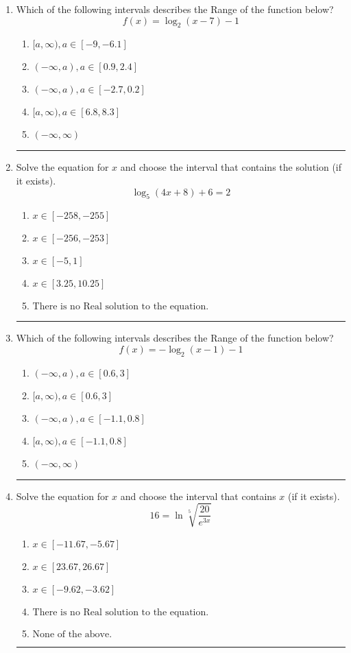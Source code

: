 \documentclass[14pt]{extbook}
\newcommand{\litem}[1]{\item#1\hspace*{-1cm}\rule{\textwidth}{0.4pt}}
\begin{document}
\begin{enumerate}
\litem{
Which of the following intervals describes the Range of the function below?\[ f(x) = \log_2{(x-7)}-1 \]\begin{enumerate}[label=\Alph*.]
\item \( [a, \infty), a \in [-9, -6.1] \)
\item \( (-\infty, a), a \in [0.9, 2.4] \)
\item \( (-\infty, a), a \in [-2.7, 0.2] \)
\item \( [a, \infty), a \in [6.8, 8.3] \)
\item \( (-\infty, \infty) \)

\end{enumerate} }
\litem{
Solve the equation for $x$ and choose the interval that contains the solution (if it exists).\[ \log_{5}{(4x+8)}+6 = 2 \]\begin{enumerate}[label=\Alph*.]
\item \( x \in [-258, -255] \)
\item \( x \in [-256, -253] \)
\item \( x \in [-5, 1] \)
\item \( x \in [3.25, 10.25] \)
\item \( \text{There is no Real solution to the equation.} \)

\end{enumerate} }
\litem{
Which of the following intervals describes the Range of the function below?\[ f(x) = -\log_2{(x-1)}-1 \]\begin{enumerate}[label=\Alph*.]
\item \( (-\infty, a), a \in [0.6, 3] \)
\item \( [a, \infty), a \in [0.6, 3] \)
\item \( (-\infty, a), a \in [-1.1, 0.8] \)
\item \( [a, \infty), a \in [-1.1, 0.8] \)
\item \( (-\infty, \infty) \)

\end{enumerate} }
\litem{
 Solve the equation for $x$ and choose the interval that contains $x$ (if it exists).\[  16 = \ln{\sqrt[5]{\frac{20}{e^{3x}}}} \]\begin{enumerate}[label=\Alph*.]
\item \( x \in [-11.67, -5.67] \)
\item \( x \in [23.67, 26.67] \)
\item \( x \in [-9.62, -3.62] \)
\item \( \text{There is no Real solution to the equation.} \)
\item \( \text{None of the above.} \)


\end{enumerate}}
\end{enumerate}
\end{document}
